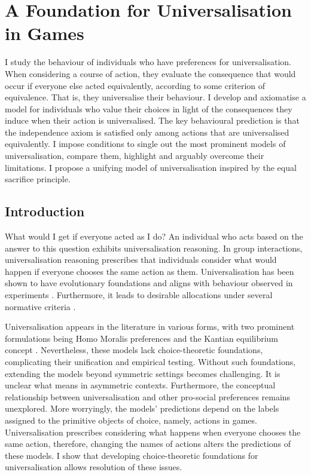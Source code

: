 \chapter{A Foundation for Universalisation in Games}\label{ch:univ}

\begin{chapterabstract}
	I study the behaviour of individuals who have preferences for universalisation. When considering a course of action, they evaluate the consequence that would occur if everyone else acted equivalently, according to some criterion of equivalence. That is, they universalise their behaviour. I develop and axiomatise a model for individuals who value their choices in light of the consequences they induce when their action is universalised. The key behavioural prediction is that the independence axiom is satisfied only among actions that are universalised equivalently. I impose conditions to single out the most prominent models of universalisation, compare them, highlight and arguably overcome their limitations. I propose a unifying model of universalisation inspired by the equal sacrifice principle.
\end{chapterabstract}

\section{Introduction}\label{sec:introuniv}

What would I get if everyone acted as I do? An individual who acts based on the answer to this question exhibits universalisation reasoning. In group interactions, universalisation reasoning prescribes that individuals consider what would happen if everyone chooses the same action as them. Universalisation has been shown to have evolutionary foundations \citep{algerHomoMoralisPreference2013} and aligns with behaviour observed in experiments \citep{levineLogicUniversalizationGuides2020,miettinenRevealedPreferencesSequential2020,vanleeuwenEstimatingSocialPreferences2024}. Furthermore, it leads to desirable allocations under several normative criteria \citep{roemerKantianEquilibrium2010}.

Universalisation appears in the literature in various forms, with two prominent formulations being Homo Moralis preferences \citep{algerHomoMoralisPreference2013} and the Kantian equilibrium concept \citep{roemer2019we}. Nevertheless, these models lack choice-theoretic foundations, complicating their unification and empirical testing. Without such foundations, extending the models beyond symmetric settings becomes challenging. It is unclear what  means in asymmetric contexts. Furthermore, the conceptual relationship between universalisation and other pro-social preferences remains unexplored. More worryingly, the models' predictions depend on the labels assigned to the primitive objects of choice, namely, actions in games. Universalisation prescribes considering what happens when everyone chooses the same action, therefore, changing the names of actions alters the predictions of these models. I show that developing choice-theoretic foundations for universalisation allows resolution of these issues.

